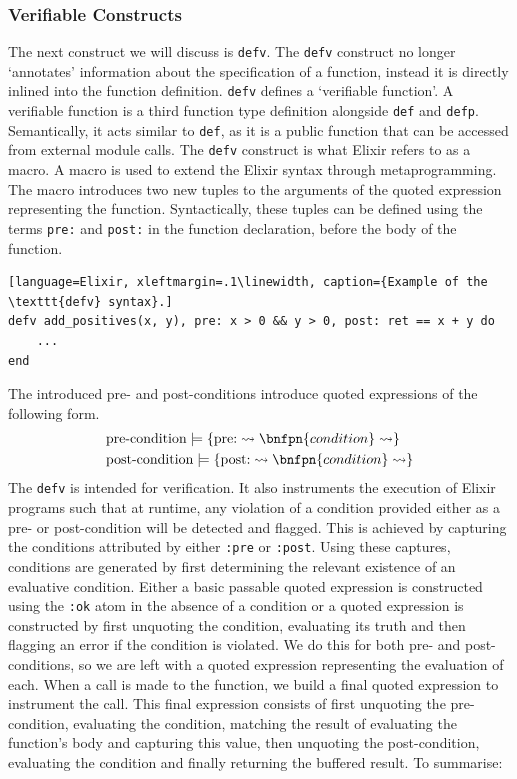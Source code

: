 \subsubsection{Verifiable Constructs}
The next construct we will discuss is \texttt{defv}. The \texttt{defv} construct no longer `annotates' information about the specification of a function, instead it is directly inlined into the function definition. \texttt{defv} defines a `verifiable function'. A verifiable function is a third function type definition alongside \texttt{def} and \texttt{defp}. Semantically, it acts similar to \texttt{def}, as it is a public function that can be accessed from external module calls. The \texttt{defv} construct is what Elixir refers to as a macro. A macro is used to extend the Elixir syntax through metaprogramming. The macro introduces two new tuples to the arguments of the quoted expression representing the function. Syntactically, these tuples can be defined using the terms \texttt{pre:} and \texttt{post:} in the function declaration, before the body of the function.
\begin{lstlisting}[language=Elixir, xleftmargin=.1\linewidth, caption={Example of the \texttt{defv} syntax}.]
defv add_positives(x, y), pre: x > 0 && y > 0, post: ret == x + y do
    ...
end
\end{lstlisting}
The introduced pre- and post-conditions introduce quoted expressions of the following form.
\[
\begin{aligned}
& \text{pre-condition} \models \{\text{pre:} \rightsquigarrow \bnfpn{condition} \rightsquigarrow \} \\
& \text{post-condition} \models \{\text{post:} \rightsquigarrow \bnfpn{condition} \rightsquigarrow \}
\end{aligned}
\]
The \texttt{defv} is intended for verification. It also instruments the execution of Elixir programs such that at runtime, any violation of a condition provided either as a pre- or post-condition will be detected and flagged. This is achieved by capturing the conditions attributed by either \texttt{:pre} or \texttt{:post}. Using these captures, conditions are generated by first determining the relevant existence of an evaluative condition. Either a basic passable quoted expression is constructed using the \texttt{:ok} atom in the absence of a condition or a quoted expression is constructed by first unquoting the condition, evaluating its truth and then flagging an error if the condition is violated. We do this for both pre- and post-conditions, so we are left with a quoted expression representing the evaluation of each. When a call is made to the function, we build a final quoted expression to instrument the call. This final expression consists of first unquoting the pre-condition, evaluating the condition, matching the result of evaluating the function's body and capturing this value, then unquoting the post-condition, evaluating the condition and finally returning the buffered result. To summarise:
